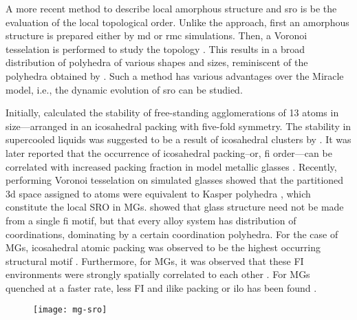 A more recent method to describe local amorphous structure and \gls{sro} is be the evaluation of the local topological order. Unlike the \textcite{Miracle2004,Miracle2013} approach, first an amorphous structure is prepared either by \gls{md} or \gls{rmc} simulations. Then, a Voronoi tesselation is performed to study the topology \cite{Sheng2006,Fukunaga2006}. This results in a broad distribution of polyhedra of various shapes and sizes, reminiscent of the polyhedra obtained by \textcite{Bernal1959}. Such a method has various advantages over the Miracle model, i.e., the dynamic evolution of \gls{sro} can be studied. \par

Initially, \textcite{Honeycutt1987} calculated the stability of free-standing agglomerations of 13 atoms in size—arranged in an icosahedral packing with five-fold symmetry. The stability in supercooled liquids was suggested to be a result of icosahedral clusters by \textcite{Frank1952}. It was later reported that the occurrence of icosahedral packing–or, \gls{fi} order---can be correlated with increased packing fraction in model metallic glasses \cite{Clarke1993}. Recently, performing Voronoi tesselation on simulated glasses \cite{Sheng2006,Fukunaga2006} showed that the partitioned \gls{3d} space assigned to atoms were equivalent to Kasper polyhedra \cite{Frank1958,Doye1996}, which constitute the local SRO in MGs. \textcite{Sheng2006} showed that glass structure need not be made from a single \gls{fi} motif, but that every alloy system has distribution of coordinations, dominating by a certain coordination polyhedra. For the case of \czsix MGs, icosahedral atomic packing was observed to be the highest occurring structural motif \cite{Ding2014,Ding2014a}. Furthermore, for \cz MGs, it was observed that these FI environments were strongly spatially correlated to each other \cite{Peng2010,Li2009a}. For \cz MGs quenched at a faster rate, less FI and \gls{ilike} packing or \gls{ilo} has been found \cite{Yue2018}. \par 

\begin{figure}[!h] \centering
	\texttt{[image: mg-sro]}
	\label{f:voro-sro-mg}
\end{figure}

